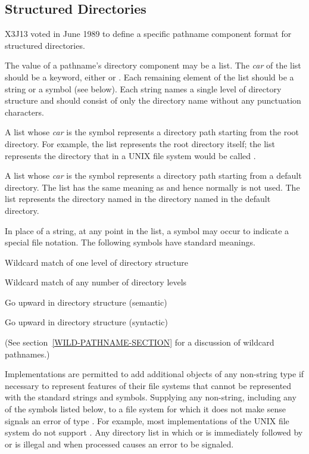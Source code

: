 \begin{newer}
\subsection{Structured Directories}
\label{STRUCTURED-DIRECTORY-SECTION}

X3J13 voted in June 1989 
to define a specific pathname component format for structured directories.

The value of a pathname's directory component may be a list.  The
  \emph{car} of the list should be a keyword, either  or .
  Each remaining element of the list should be a string or a symbol (see below).
  Each string names a single level of directory structure and should consist
  of only the directory name without any punctuation characters.

  A list whose \emph{car} is the symbol  represents a directory path
  starting from the root directory.  For example, the list  represents
  the root directory itself;  the list  represents
  the directory that in a UNIX file system would be called .

  A list whose \emph{car} is the symbol  represents a directory path
  starting from a default directory.  The list  has the same
  meaning as  and hence normally is not used.  The list 
  represents the directory named  in the directory named  in the
  default directory.

  In place of a string, at any point in the list, a symbol may occur to
  indicate a special file notation. The following symbols have standard
  meanings.
\begin{indentdesc}{7pc}
\item[\cd{:wild}]            Wildcard match of one level of directory structure
\item[\cd{:wild-inferiors}]  Wildcard match of any number of directory levels
\item[\cd{:up}]              Go upward in directory structure (semantic)
\item[\cd{:back}]            Go upward in directory structure (syntactic)
\end{indentdesc}
  (See section~\ref{WILD-PATHNAME-SECTION} for a discussion of wildcard pathnames.)

  Implementations are permitted to add additional objects of any
  non-string type if necessary to represent features of their file systems
  that cannot be represented with the standard strings and symbols.
  Supplying any non-string, including any of the symbols listed below, to a
  file system for which it does not make sense signals an error of type
  .  For example, most implementations of the UNIX file system
  do not support .  Any directory list in which
   or  is immediately followed by  or 
  is illegal and when  processed causes an error to be signaled.


\end{newer}
